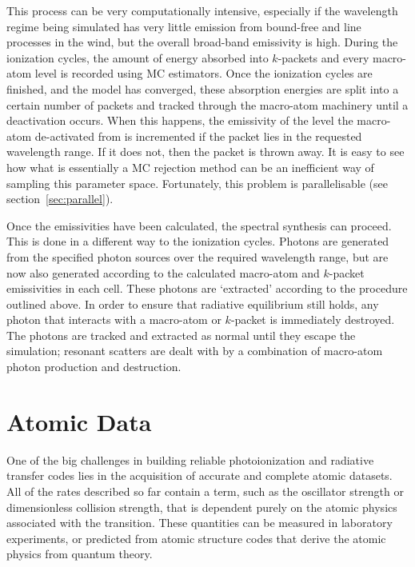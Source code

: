 This process can be very computationally intensive, especially if the wavelength regime
being simulated has very little emission from bound-free and line processes
in the wind, but the overall broad-band emissivity is high.
During the ionization cycles, the amount of energy absorbed into $k$-packets and 
every macro-atom level is recorded using MC estimators. Once 
the ionization cycles are finished, and the model has converged, these absorption
energies are split into a certain number of packets and tracked through
the macro-atom machinery until a deactivation occurs. When this happens,
the emissivity of the level the macro-atom de-activated from is incremented
if the packet lies in the requested wavelength range. If it does not, then 
the packet is thrown away. It is easy to see how what is essentially a MC rejection
method can be an inefficient way of sampling this parameter space. Fortunately,
this problem is parallelisable (see section~\ref{sec:parallel}).

Once the emissivities have been calculated, the spectral synthesis can proceed.
This is done in a different way to the ionization cycles. Photons 
are generated from the specified photon sources over the required wavelength range,
but are now also generated according to the calculated macro-atom and 
$k$-packet emissivities in each cell. These photons are `extracted' according
to the procedure outlined above.
In order to ensure that radiative equilibrium 
still holds, any photon that interacts with a macro-atom or $k$-packet is immediately 
destroyed. The photons are tracked and extracted as normal until they escape the 
simulation; resonant scatters are dealt with by a combination of
macro-atom photon production and destruction.

\section{Atomic Data}
\label{sec:atomic_data}
One of the big challenges in building reliable photoionization and radiative
transfer codes lies in the acquisition of accurate and complete atomic datasets.
All of the rates described so far contain a term, such as the oscillator strength 
or dimensionless collision strength, that is dependent purely on the atomic physics
associated with the transition. These quantities can be measured in laboratory experiments,
or predicted from atomic structure codes that derive the atomic physics from 
quantum theory.

